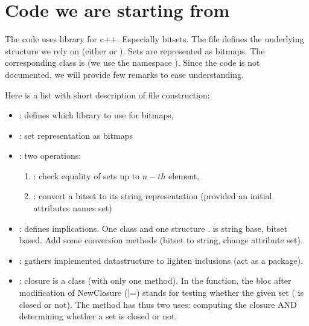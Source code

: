 \section{Code we are starting from}

The code uses  library for c++. Especially bitsets. The file 
 defines the underlying structure we rely on (either 
 or ). Sets are represented as bitmaps. The 
corresponding class is  (we use the namespace ).
Since the code is not documented, we will provide few remarks to ease
understanding.

Here is a list with short description of file construction:
\begin{itemize}
	\item {}: defines which library to use for bitmaps,
	\item {}: set representation as bitmaps
	\item {}: two operations:
		\begin{enumerate}
			\item {}: check equality of sets up to $n-th$
			element,
			\item {}: convert a bitset to its string representation
			(provided an initial attributes names set)
		\end{enumerate}
	\item {}: defines implications. One 
	class and one structure .  is string
	base,  bitset based. Add some conversion methods (bitset
	to string, change attribute set).
	
	\item {}: gathers implemented datastructure to lighten
	inclusions (act as a package).
	
	\item {}: closure is a class (with only one method). In
	the  function, the  bloc after 
	modification of NewClosure (|=) stands for testing whether the given set
	( is closed or not). The method has thus two uses: computing
	the closure AND determining whether a set is closed or not.
	
\end{itemize}